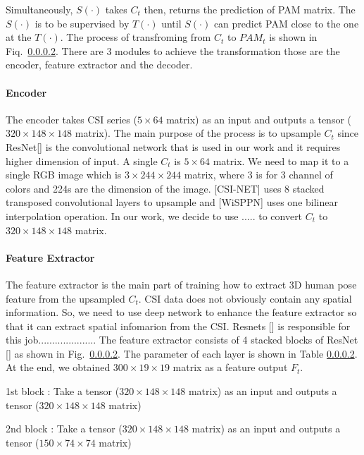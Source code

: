 \documentclass[conference]{IEEEtran}
\begin{document}
	 Simultaneously, $S(·)$ takes $C_t$  then, returns the  prediction of PAM matrix.
	 The $S(·)$ is to be supervised by $T(·)$ until $S(·)$ can predict PAM close to the one at the $T(·)$. The process of transfroming from $C_t$ to $PAM_t$ is shown in Fiq.~\ref{}. There are 3 modules to achieve the transformation those are the encoder, feature extractor and the decoder.
	 
	 
	 	\paragraph{Encoder}
	 	The encoder takes CSI series ($5\times64$ matrix) as an input and outputs a tensor ($320\times148\times148$  matrix). The main purpose of the process is to upsample $C_t$ since ResNet[] is the convolutional network that is used in our work and it requires higher dimension of input. A single $C_t$ is 
	 	$5\times64$ matrix. We need to map it to a single RGB image which is $3\times244\times244$ matrix, where 3 is for 3 channel of colors and 224s are the dimension of the image. [CSI-NET] uses 8 stacked transposed convolutional layers to upsample and [WiSPPN] uses one
	 	bilinear interpolation operation. In our work, we decide to use ..... to convert $C_t$ to $320\times148\times148$  matrix.
	 	
	 	
	 	
	 	
	 	\paragraph{Feature Extractor}
	 	The feature extractor is the main part of training how to extract 3D human pose feature from the upsampled $C_t$. CSI data does not obviously contain any spatial information. So, we need to use deep network to enhance the feature extractor so that it can extract spatial infomarion from the CSI. Resnets [] is responsible for this job..................... The feature extractor consists of 4 stacked blocks of ResNet [] as shown in Fig.~\ref{}. The parameter of each layer is shown in Table \ref{}. At the end, we obtained $300\times19\times19$  matrix as a feature output $F_t$.
	 	
	 	
	 	
	 	1st block : Take a tensor ($320\times148\times148$   matrix) as an input and outputs a tensor ($320\times148\times148$  matrix)
	 	
	 	2nd block : Take a tensor ($320\times148\times148$   matrix) as an input and outputs a tensor ($150\times74\times74$  matrix)
	 	
\end{document}
